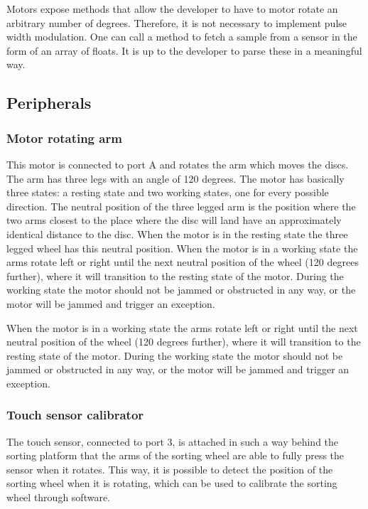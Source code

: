 \documentclass[a4paper,oneside,11pt]{article}
\begin{document}
Motors expose methods that allow the developer to have to motor rotate an arbitrary number of degrees. Therefore, it is not necessary to implement pulse width modulation. One can call a method to fetch a sample from a sensor in the form of an array of floats. It is up to the developer to parse these in a meaningful way.

\subsection{Peripherals}

\subsubsection{Motor rotating arm}
This motor is connected to port A and rotates the arm which moves the discs. The arm has three legs with an angle of 120 degrees. The motor has basically three states: a resting state and two working states, one for every possible direction. The neutral position of the three legged arm is the position where the two arms closest to the place where the disc will land have an approximately identical distance to the disc. When the motor is in the resting state the three legged wheel has this neutral position. When the motor is in a working state the arms rotate left or right until the next neutral position of the wheel (120 degrees further), where it will transition to the resting state of the motor. During the working state the motor should not be jammed or obstructed in any way, or the motor will be jammed and trigger an exception.

When the motor is in a working state the arms rotate left or right until the next neutral position of the wheel (120 degrees further), where it will transition to the resting state of the motor. During the working state the motor should not be jammed or obstructed in any way, or the motor will be jammed and trigger an exception.

\subsubsection{Touch sensor calibrator}
The touch sensor, connected to port 3, is attached in such a way behind the sorting platform that the arms of the sorting wheel are able to fully press the sensor when it rotates. This way, it is possible to detect the position of the sorting wheel when it is rotating, which can be used to calibrate the sorting wheel through software.
\end{document}
